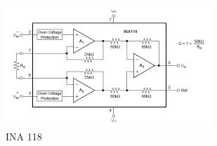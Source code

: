 	\begin{figure}[htbp]
		\centering
			\includegraphics[scale=1.4]{figuras/fig-ina118}
		\caption{INA 118 \cite{schematic-ina118}}
		\label{fig-ina118}
	\end{figure}




